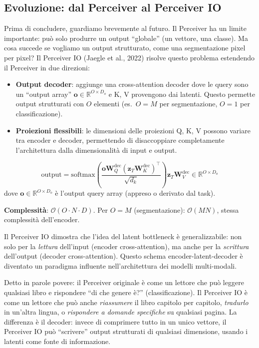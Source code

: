 \documentclass[12pt,a4paper]{article}
\begin{document}
\subsection{Evoluzione: dal Perceiver al Perceiver IO} \label{sec:perceiver_io_preview}

Prima di concludere, guardiamo brevemente al futuro. Il Perceiver ha un limite importante: pu\`o solo produrre un output ``globale'' (un vettore, una classe). Ma cosa succede se vogliamo un output strutturato, come una segmentazione pixel per pixel? Il Perceiver IO (Jaegle et al., 2022) risolve questo problema estendendo il Perceiver in due direzioni:
\begin{itemize}
    \item \textbf{Output decoder}: aggiunge una cross-attention decoder dove le query sono un ``output array'' $\mathbf{o} \in \mathbb{R}^{O \times D_o}$ e K, V provengono dai latenti. Questo permette output strutturati con $O$ elementi (es.\ $O = M$ per segmentazione, $O = 1$ per classificazione).
    \item \textbf{Proiezioni flessibili}: le dimensioni delle proiezioni Q, K, V possono variare tra encoder e decoder, permettendo di disaccoppiare completamente l'architettura dalla dimensionalit\`a di input e output.
\end{itemize}

\begin{formulabox}
\[
    \text{output} = \text{softmax}\!\left(\frac{\mathbf{o}\mathbf{W}_Q^{\text{dec}} (\mathbf{z}_T \mathbf{W}_K^{\text{dec}})^\top}{\sqrt{d_k}}\right) \mathbf{z}_T \mathbf{W}_V^{\text{dec}} \in \mathbb{R}^{O \times D_o}
\]
dove $\mathbf{o} \in \mathbb{R}^{O \times D_o}$ \`e l'output query array (appreso o derivato dal task).

\textbf{Complessit\`a}: $\mathcal{O}(O \cdot N \cdot D)$. Per $O = M$ (segmentazione): $\mathcal{O}(MN)$, stessa complessit\`a dell'encoder.
\end{formulabox}

Il Perceiver IO dimostra che l'idea del latent bottleneck \`e generalizzabile: non solo per la \emph{lettura} dell'input (encoder cross-attention), ma anche per la \emph{scrittura} dell'output (decoder cross-attention). Questo schema encoder-latent-decoder \`e diventato un paradigma influente nell'architettura dei modelli multi-modali.

\begin{notabox}
Detto in parole povere: il Perceiver originale \`e come un lettore che pu\`o leggere qualsiasi libro e rispondere ``di che genere \`e?'' (classificazione). Il Perceiver IO \`e come un lettore che pu\`o anche \emph{riassumere} il libro capitolo per capitolo, \emph{tradurlo} in un'altra lingua, o \emph{rispondere a domande specifiche} su qualsiasi pagina. La differenza \`e il decoder: invece di comprimere tutto in un unico vettore, il Perceiver IO pu\`o ``scrivere'' output strutturati di qualsiasi dimensione, usando i latenti come fonte di informazione.
\end{notabox}
\end{document}
